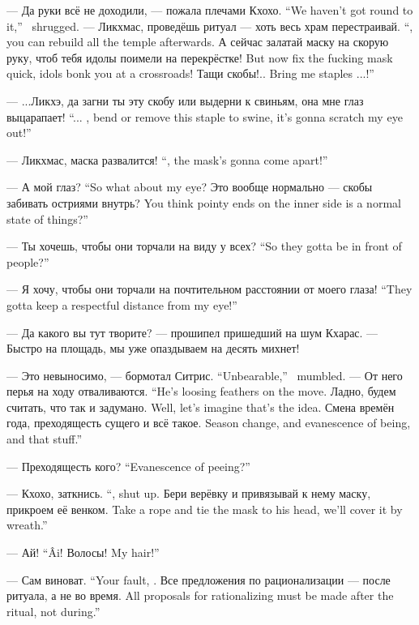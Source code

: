 {--- Да руки всё не доходили, --- пожала плечами Кхохо.}
{``We haven't got round to it,'' \Kchoho\ shrugged.}
{--- Ликхмас, проведёшь ритуал --- хоть весь храм перестраивай.}
{``\Likchmas, you can rebuild all the temple afterwards.}
{А сейчас залатай маску на скорую руку, чтоб тебя идолы поимели на перекрёстке!}
{But now fix the fucking mask quick, idols bonk you at a crossroads!}
{Тащи скобы!..}
{Bring me staples ...!''}

{--- ...Ликхэ, да загни ты эту скобу или выдерни к свиньям, она мне глаз выцарапает!}
{``... \Likchoe, bend or remove this staple to swine, it's gonna scratch my eye out!''}

{--- Ликхмас, маска развалится!}
{``\Likchmas, the mask's gonna come apart!''}

{--- А мой глаз?}
{``So what about my eye?}
{Это вообще нормально --- скобы забивать остриями внутрь?}
{You think pointy ends on the inner side is a normal state of things?''}

{--- Ты хочешь, чтобы они торчали на виду у всех?}
{``So they gotta be in front of people?''}

{--- Я хочу, чтобы они торчали на почтительном расстоянии от моего глаза!}
{``They gotta keep a respectful distance from my eye!''}

--- Да какого вы тут творите? --- прошипел пришедший на шум Кхарас.
--- Быстро на площадь, мы уже опаздываем на десять михнет!

{--- Это невыносимо, --- бормотал Ситрис.}
{``Unbearable,'' \Sitris\ mumbled.}
{--- От него перья на ходу отваливаются.}
{``He's loosing feathers on the move.}
{Ладно, будем считать, что так и задумано.}
{Well, let's imagine that's the idea.}
{Смена времён года, преходящесть сущего и всё такое.}
{Season change, and evanescence of being, and that stuff.''}

{--- Преходящесть кого?}
{``Evanescence of peeing?''}

{--- Кхохо, заткнись.}
{``\Kchoho, shut up.}
{Бери верёвку и привязывай к нему маску, прикроем её венком.}
{Take a rope and tie the mask to his head, we'll cover it by wreath.''}

{--- Ай!}
{``\^{A}i!}
{Волосы!}
{My hair!''}

{--- Сам виноват.}
{``Your fault, \Likchmas.}
{Все предложения по рационализации --- после ритуала, а не во время.}
{All proposals for rationalizing must be made after the ritual, not during.''}

